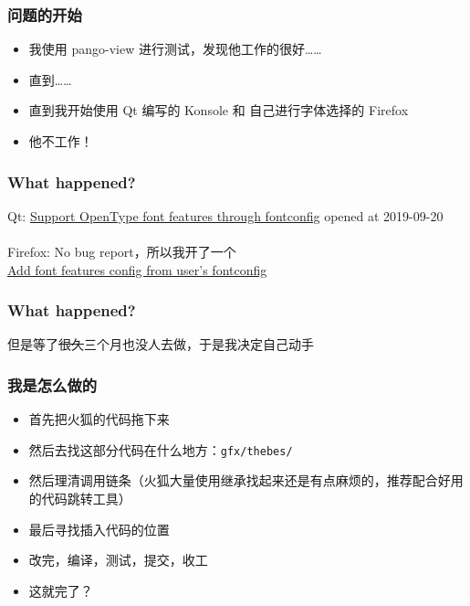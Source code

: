 \documentclass[UTF-8]{ctexbeamer}
\newcommand{\emptyline}{\vspace{\baselineskip}}
\begin{document}
\begin{frame}[fragile]
	\frametitle{问题的开始}
	
	\begin{itemize}[<+->]
		\item 我使用 pango-view 进行测试，发现他工作的很好……
		\item 直到……
		\item 直到我开始使用 Qt 编写的 Konsole 和 自己进行字体选择的 Firefox
		\item 他不工作！
	\end{itemize}
	
\end{frame}

\begin{frame}
	\frametitle{What happened?}
	
	Qt: \href{https://bugreports.qt.io/browse/QTBUG-78645}{Support OpenType font features through fontconfig} opened at 2019-09-20 \\
	\emptyline \\
	Firefox: No bug report，所以我开了一个\\ \href{https://bugzilla.mozilla.org/show_bug.cgi?id=1744765}{Add font features config from user's fontconfig}
	
\end{frame}

\begin{frame}
	\frametitle{What happened?}
	
	但是等了\sout{很久}三个月也没人去做，于是我决定自己动手
	
\end{frame}

\begin{frame}[fragile]
	\frametitle{我是怎么做的}
	
	\begin{itemize}[<+->]
		\item 首先把火狐的代码拖下来
		\item 然后去找这部分代码在什么地方：\verb|gfx/thebes/|
		\item 然后理清调用链条（火狐大量使用继承找起来还是有点麻烦的，推荐配合好用的代码跳转工具）
		\item 最后寻找插入代码的位置
		\item 改完，编译，测试，提交，收工
		\item 这就完了？
	\end{itemize}
	
\end{frame}
\end{document}
